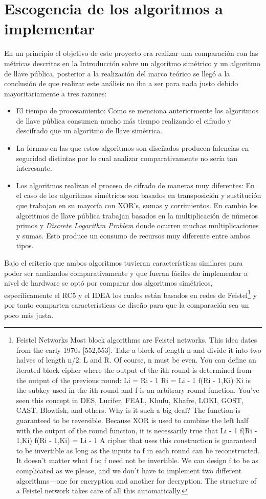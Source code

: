 \section{Escogencia de los algoritmos a implementar}
En un principio el objetivo de este proyecto era realizar una comparación con las métricas descritas en la Introducción sobre un algoritmo simétrico y un algoritmo de llave pública, posterior a la realización del marco teórico se llegó a la conclusión de que realizar este análisis no iba a ser para nada justo debido mayoritariamente a tres razones:
\begin{itemize}
\item El tiempo de procesamiento: Como se menciona anteriormente los algoritmos de llave pública consumen mucho más tiempo realizando el cifrado y descifrado que un algoritmo de llave simétrica.
\item La formas en las que estos algoritmos son diseñados producen falencias en seguridad distintas por lo cual analizar comparativamente no sería tan interesante.
\item Los algoritmos realizan el proceso de cifrado de maneras muy diferentes: En el caso de los algoritmos simétricos son basados en transposición y sustitución que trabajan en su mayoría con XOR's, sumas y corrimientos. En cambio los algoritmos de llave pública trabajan  basados en la multiplicación de números primos y \textit{Discrete Logarithm Problem} donde ocurren muchas multiplicaciones y sumas. Esto produce un consumo de recursos muy diferente entre ambos tipos.
\end{itemize}

Bajo el criterio que ambos algoritmos tuvieran características similares para poder ser analizados comparativamente y que fueran fáciles de implementar a nivel de hardware se optó por comparar dos algoritmos simétricos, específicamente el RC5 y el IDEA los cuales están basados en redes de Feistel\footnote{Feistel Networks
Most block algorithms are Feistel networks. This idea dates from the early
1970s [552,553]. Take a block of length n and divide it into two halves of
length n/2: L and R. Of course, n must be even. You can define an iterated
block cipher where the output of the ith round is determined from the output of
the previous round:
Li = Ri - 1
Ri = Li - 1  f(Ri - 1,Ki)
Ki is the subkey used in the ith round and f is an arbitrary round function.
You’ve seen this concept in DES, Lucifer, FEAL, Khufu, Khafre, LOKI,
GOST, CAST, Blowfish, and others. Why is it such a big deal? The function is
guaranteed to be reversible. Because XOR is used to combine the left half with
the output of the round function, it is necessarily true that
Li - 1  f(Ri - 1,Ki)  f(Ri - 1,Ki) = Li - 1
A cipher that uses this construction is guaranteed to be invertible as long as the
inputs to f in each round can be reconstructed. It doesn’t matter what f is; f
need not be invertible. We can design f to be as complicated as we please, and
we don’t have to implement two different algorithms—one for encryption and
another for decryption. The structure of a Feistel network takes care of all this
automatically.
} y por tanto comparten características de diseño para que la comparación sea un poco más justa.



